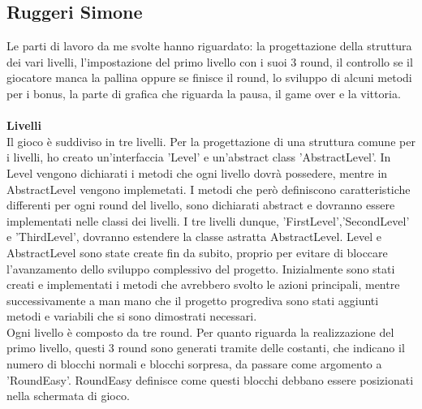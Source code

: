 \documentclass[a4paper,12pt]{report}
\begin{document}
\subsection{Ruggeri Simone}
Le parti di lavoro da me svolte hanno riguardato: la progettazione della struttura dei vari livelli,
l'impostazione del primo livello con i suoi 3 round, il controllo se il giocatore manca la pallina oppure se finisce il round, lo sviluppo di
alcuni metodi per i bonus, la parte di grafica che riguarda la pausa, il game over e la vittoria.\\\\
\textbf{Livelli}\\
Il gioco è suddiviso in tre livelli. Per la progettazione di una struttura comune per i livelli, ho creato un'interfaccia 'Level' e
un'abstract class 'AbstractLevel'. In Level vengono dichiarati i metodi che ogni livello dovrà possedere, mentre in AbstractLevel vengono implemetati. I metodi che
però definiscono caratteristiche differenti per ogni round del livello, sono dichiarati abstract e dovranno essere implementati nelle classi dei livelli. I tre livelli
dunque, 'FirstLevel','SecondLevel' e 'ThirdLevel', dovranno estendere la classe astratta AbstractLevel.
Level e AbstractLevel sono state create fin da subito, proprio per evitare di bloccare l'avanzamento dello sviluppo complessivo del progetto.
Inizialmente sono stati creati e implementati i metodi che avrebbero svolto le azioni principali, mentre successivamente a man mano che il progetto progrediva
sono stati aggiunti metodi e variabili che si sono dimostrati necessari.\\
Ogni livello è composto da tre round. Per quanto riguarda la realizzazione del primo livello, questi 3 round sono generati tramite delle costanti, che indicano
il numero di blocchi normali e blocchi sorpresa, da passare come argomento a 'RoundEasy'. RoundEasy definisce come questi blocchi debbano essere posizionati
nella schermata di gioco.
\end{document}
